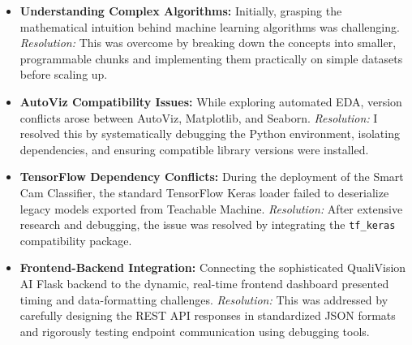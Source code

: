 \begin{itemize}[leftmargin=1.5cm]
    \item \textbf{Understanding Complex Algorithms:} Initially, grasping the mathematical intuition behind machine learning algorithms was challenging. \textit{Resolution:} This was overcome by breaking down the concepts into smaller, programmable chunks and implementing them practically on simple datasets before scaling up.
    \item \textbf{AutoViz Compatibility Issues:} While exploring automated EDA, version conflicts arose between AutoViz, Matplotlib, and Seaborn. \textit{Resolution:} I resolved this by systematically debugging the Python environment, isolating dependencies, and ensuring compatible library versions were installed.
    \item \textbf{TensorFlow Dependency Conflicts:} During the deployment of the Smart Cam Classifier, the standard TensorFlow Keras loader failed to deserialize legacy models exported from Teachable Machine. \textit{Resolution:} After extensive research and debugging, the issue was resolved by integrating the \texttt{tf\_keras} compatibility package.
    \item \textbf{Frontend-Backend Integration:} Connecting the sophisticated QualiVision AI Flask backend to the dynamic, real-time frontend dashboard presented timing and data-formatting challenges. \textit{Resolution:} This was addressed by carefully designing the REST API responses in standardized JSON formats and rigorously testing endpoint communication using debugging tools.
\end{itemize}
